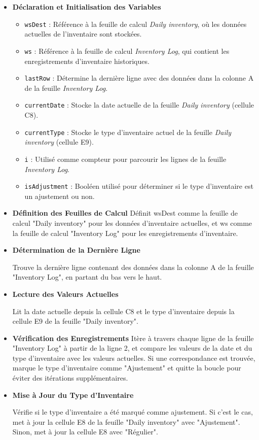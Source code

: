 \documentclass[a4paper, oneside, 12pt, final]{extreport}
\begin{document}
\begin{itemize}

\item\textbf{Déclaration et Initialisation des Variables}

\begin{itemize}
    \item \texttt{wsDest} : Référence à la feuille de calcul \textit{Daily inventory}, où les données actuelles de l'inventaire sont stockées.
    \item \texttt{ws} : Référence à la feuille de calcul \textit{Inventory Log}, qui contient les enregistrements d'inventaire historiques.
    \item \texttt{lastRow} : Détermine la dernière ligne avec des données dans la colonne A de la feuille \textit{Inventory Log}.
    \item \texttt{currentDate} : Stocke la date actuelle de la feuille \textit{Daily inventory} (cellule C8).
    \item \texttt{currentType} : Stocke le type d'inventaire actuel de la feuille \textit{Daily inventory} (cellule E9).
    \item \texttt{i} : Utilisé comme compteur pour parcourir les lignes de la feuille \textit{Inventory Log}.
    \item \texttt{isAdjustment} : Booléen utilisé pour déterminer si le type d'inventaire est un ajustement ou non.
\end{itemize}

\item\textbf{Définition des Feuilles de Calcul}
Définit wsDest comme la feuille de calcul "Daily inventory" pour les données d'inventaire actuelles, et ws comme la feuille de calcul "Inventory Log" pour les enregistrements d'inventaire.

\item\textbf{Détermination de la Dernière Ligne}

Trouve la dernière ligne contenant des données dans la colonne A de la feuille "Inventory Log", en partant du bas vers le haut.


\item\textbf{Lecture des Valeurs Actuelles}


Lit la date actuelle depuis la cellule C8 et le type d'inventaire depuis la cellule E9 de la feuille "Daily inventory".

\item\textbf{Vérification des Enregistrements}
Itère à travers chaque ligne de la feuille "Inventory Log" à partir de la ligne 2, et compare les valeurs de la date et du type d'inventaire avec les valeurs actuelles. Si une correspondance est trouvée, marque le type d'inventaire comme "Ajustement" et quitte la boucle pour éviter des itérations supplémentaires.


\item\textbf{Mise à Jour du Type d'Inventaire}

Vérifie si le type d'inventaire a été marqué comme ajustement. Si c'est le cas, met à jour la cellule E8 de la feuille "Daily inventory" avec "Ajustement". Sinon, met à jour la cellule E8 avec "Régulier".

\end{itemize}
\end{document}

